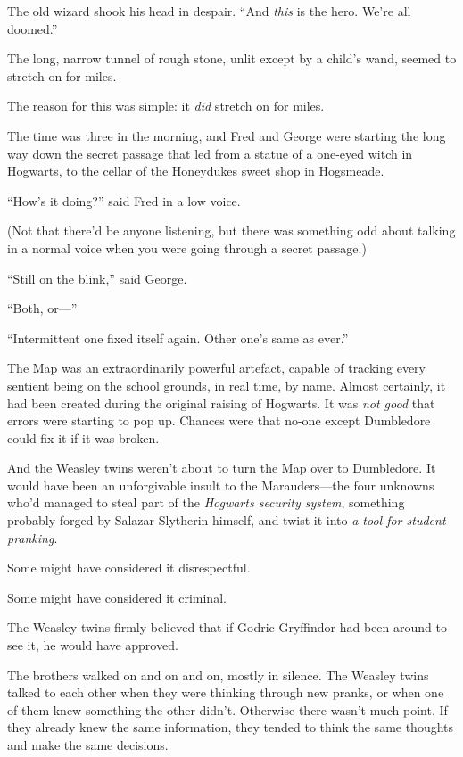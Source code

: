 The old wizard shook his head in despair. “And \emph{this} is the hero. We’re all doomed.”


The long, narrow tunnel of rough stone, unlit except by a child’s wand, seemed to stretch on for miles.

The reason for this was simple: it \emph{did} stretch on for miles.

The time was three in the morning, and Fred and George were starting the long way down the secret passage that led from a statue of a one-eyed witch in Hogwarts, to the cellar of the Honeydukes sweet shop in Hogsmeade.

“How’s it doing?” said Fred in a low voice.

(Not that there’d be anyone listening, but there was something odd about talking in a normal voice when you were going through a secret passage.)

“Still on the blink,” said George.

“Both, or—”

“Intermittent one fixed itself again. Other one’s same as ever.”

The Map was an extraordinarily powerful artefact, capable of tracking every sentient being on the school grounds, in real time, by name. Almost certainly, it had been created during the original raising of Hogwarts. It was \emph{not good} that errors were starting to pop up. Chances were that no-one except Dumbledore could fix it if it was broken.

And the Weasley twins weren’t about to turn the Map over to Dumbledore. It would have been an unforgivable insult to the Marauders—the four unknowns who’d managed to steal part of the \emph{Hogwarts security system}, something probably forged by Salazar Slytherin himself, and twist it into \emph{a tool for student pranking}.

Some might have considered it disrespectful.

Some might have considered it criminal.

The Weasley twins firmly believed that if Godric Gryffindor had been around to see it, he would have approved.

The brothers walked on and on and on, mostly in silence. The Weasley twins talked to each other when they were thinking through new pranks, or when one of them knew something the other didn’t. Otherwise there wasn’t much point. If they already knew the same information, they tended to think the same thoughts and make the same decisions.


